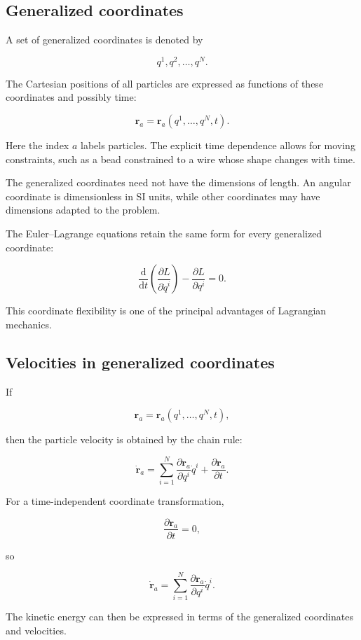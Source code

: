 \subsection{Generalized coordinates}

A set of generalized coordinates is denoted by

\[
q^{1},q^{2},\ldots,q^{N}.
\]

The Cartesian positions of all particles are expressed as functions of these coordinates and possibly time:

\[
\mathbf{r}_{a}
=
\mathbf{r}_{a}(q^{1},\ldots,q^{N},t).
\]

Here the index \(a\) labels particles. The explicit time dependence allows for moving constraints, such as a bead constrained to a wire whose shape changes with time.

The generalized coordinates need not have the dimensions of length. An angular coordinate is dimensionless in SI units, while other coordinates may have dimensions adapted to the problem.

The Euler--Lagrange equations retain the same form for every generalized coordinate:

\[
\boxed{
\frac{\mathrm{d}}{\mathrm{d}t}
\left(
\frac{\partial L}{\partial\dot q^{i}}
\right)
-
\frac{\partial L}{\partial q^{i}}
=0
}.
\]

This coordinate flexibility is one of the principal advantages of Lagrangian mechanics.

\subsection{Velocities in generalized coordinates}

If

\[
\mathbf{r}_{a}
=
\mathbf{r}_{a}(q^{1},\ldots,q^{N},t),
\]

then the particle velocity is obtained by the chain rule:

\[
\boxed{
\dot{\mathbf{r}}_{a}
=
\sum_{i=1}^{N}
\frac{\partial\mathbf{r}_{a}}{\partial q^{i}}
\dot q^{i}
+
\frac{\partial\mathbf{r}_{a}}{\partial t}
}.
\]

For a time-independent coordinate transformation,

\[
\frac{\partial\mathbf{r}_{a}}{\partial t}=0,
\]

so

\[
\dot{\mathbf{r}}_{a}
=
\sum_{i=1}^{N}
\frac{\partial\mathbf{r}_{a}}{\partial q^{i}}
\dot q^{i}.
\]

The kinetic energy can then be expressed in terms of the generalized coordinates and velocities.


